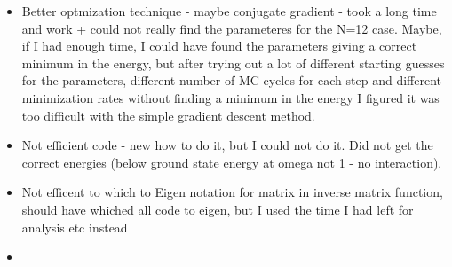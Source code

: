 \begin{itemize}
\item Better optmization technique - maybe conjugate gradient - took a long time and work + could not really find the parameteres for the N=12 case. Maybe, if I had enough time, I could have found the parameters giving a correct minimum in the energy, but after trying out a lot of different starting guesses for the parameters, different number of MC cycles for each step and different minimization rates without finding a minimum in the energy I figured it was too difficult with the simple gradient descent method. 
\item Not efficient code - new how to do it, but I could not do it. Did not get the correct energies (below ground state energy at omega not 1 - no interaction).
\item Not efficent to which to Eigen notation for matrix in inverse matrix function, should have whiched all code to eigen, but I used the time I had left for analysis etc instead
\item 
\end{itemize}


